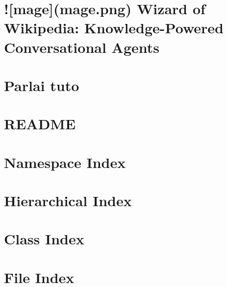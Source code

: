 \documentclass[twoside]{book}
\newcommand{\+}{\discretionary{\mbox{\scriptsize$\hookleftarrow$}}{}{}}
\begin{document}
\chapter{!\mbox{[}mage\mbox{]}(mage.\+png) Wizard of Wikipedia\+: Knowledge-\/\+Powered Conversational Agents}
\label{md_projects_wizard_of_wikipedia_README}

\chapter{Parlai tuto}
\label{md_README}

\chapter{R\+E\+A\+D\+ME}
\label{md_website_README}

\chapter{Namespace Index}

\chapter{Hierarchical Index}

\chapter{Class Index}

\chapter{File Index}

\end{document}
